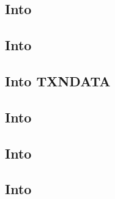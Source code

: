 \subsection{Into \hubMod{}}              \label{rlptxn: lookup: into HUB}                
\subsection{Into \romMod{}}              \label{rlptxn: lookup: into ROM}                
\subsection{Into TXNDATA}          \label{rlptxn: lookup: into TXN_DATA}           
\subsection{Into \btcMod{}}              \label{rlptxn: lookup: into BLOCK_DATA}         
\subsection{Into \rlpUtilsMod{}}         \label{rlptxn: lookup: into RLP_UTILS}          
\subsection{Into \trmMod{}}              \label{rlptxn: lookup: into TRM}                
